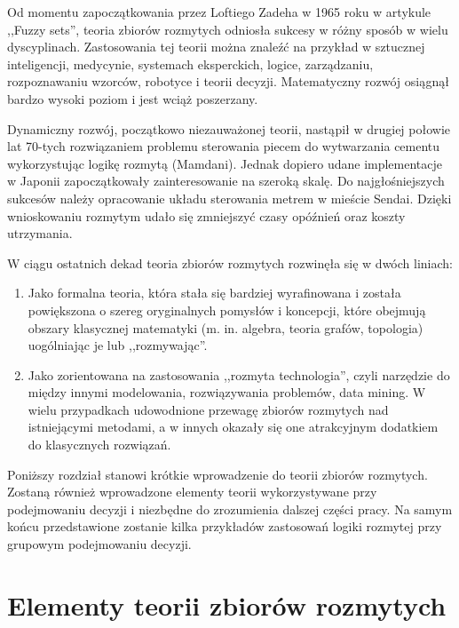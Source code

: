 Od momentu zapoczątkowania przez Loftiego Zadeha w 1965 roku w artykule ,,Fuzzy
sets'', teoria zbiorów rozmytych odniosła sukcesy w różny sposób w wielu
dyscyplinach. Zastosowania tej teorii można znaleźć na przykład w sztucznej 
inteligencji, medycynie, systemach eksperckich, logice, zarządzaniu, 
rozpoznawaniu wzorców, robotyce i teorii decyzji. Matematyczny rozwój osiągnął 
bardzo wysoki poziom i jest wciąż poszerzany.

Dynamiczny rozwój, początkowo niezauważonej teorii, nastąpił w drugiej połowie 
lat 70-tych rozwiązaniem problemu sterowania piecem do wytwarzania cementu 
wykorzystując logikę rozmytą (Mamdani). Jednak dopiero udane implementacje w 
Japonii zapoczątkowały zainteresowanie na szeroką skalę. Do najgłośniejszych 
sukcesów należy opracowanie układu sterowania metrem w mieście Sendai. Dzięki 
wnioskowaniu rozmytym udało się zmniejszyć czasy opóźnień oraz koszty utrzymania.

W ciągu ostatnich dekad teoria zbiorów rozmytych rozwinęła się w dwóch liniach:
\begin{enumerate}[1)]
  
  \item Jako formalna teoria, która stała się bardziej wyrafinowana i została 
  powiększona o szereg oryginalnych pomysłów i koncepcji, które obejmują obszary 
  klasycznej matematyki (m. in. algebra, teoria grafów, topologia) uogólniając
  je lub ,,rozmywając''.
  
  \item Jako zorientowana na zastosowania ,,rozmyta technologia'', czyli
  narzędzie do między innymi modelowania, rozwiązywania problemów, data mining. 
  W wielu przypadkach udowodnione przewagę zbiorów rozmytych nad istniejącymi 
  metodami, a w innych okazały się one atrakcyjnym dodatkiem do klasycznych 
  rozwiązań.

\end{enumerate}

Poniższy rozdział stanowi krótkie wprowadzenie do teorii zbiorów rozmytych. 
Zostaną również wprowadzone elementy teorii wykorzystywane przy podejmowaniu 
decyzji i niezbędne do zrozumienia dalszej części pracy. Na samym końcu 
przedstawione zostanie kilka przykładów zastosowań logiki rozmytej przy 
grupowym podejmowaniu decyzji.

\section{Elementy teorii zbiorów rozmytych}

